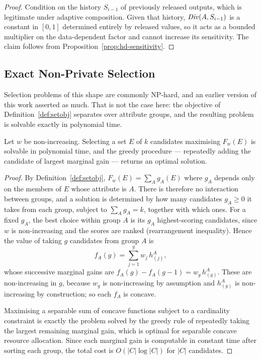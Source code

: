 \begin{proof}
Condition on the history $S_{i-1}$ of previously released outputs, which is legitimate under adaptive composition.
Given that history, $\mathit{Div}(A,S_{i-1})$ is a constant in $[0,1]$ determined entirely by released values, so it acts as a bounded multiplier on the data-dependent factor and cannot increase its sensitivity.
The claim follows from Proposition~\ref{prop:hd-sensitivity}.
\end{proof}

\subsection{Exact Non-Private Selection}
\label{subsec:non-private-hardness}

Selection problems of this shape are commonly NP-hard, and an earlier version of this work asserted as much.
That is not the case here: the objective of Definition~\ref{def:setobj} separates over attribute groups, and the resulting problem is solvable exactly in polynomial time.

\begin{theorem}
\label{thm:non-private-hardness}
Let $w$ be non-increasing.
Selecting a set $E$ of $k$ candidates maximising $F_w(E)$ is solvable in polynomial time, and the greedy procedure --- repeatedly adding the candidate of largest marginal gain --- returns an optimal solution.
\end{theorem}

\begin{proof}
By Definition~\ref{def:setobj}, $F_w(E)=\sum_A g_A(E)$ where $g_A$ depends only on the members of $E$ whose attribute is $A$.
There is therefore no interaction between groups, and a solution is determined by how many candidates $g_A\ge0$ it takes from each group, subject to $\sum_A g_A=k$, together with which ones.
For a fixed $g_A$, the best choice within group $A$ is its $g_A$ highest-scoring candidates, since $w$ is non-increasing and the scores are ranked (rearrangement inequality).
Hence the value of taking $g$ candidates from group $A$ is
\[
f_A(g)=\sum_{j=1}^{g} w_j\, h^A_{(j)},
\]
whose successive marginal gains are $f_A(g)-f_A(g-1)=w_g\,h^A_{(g)}$.
These are non-increasing in $g$, because $w_g$ is non-increasing by assumption and $h^A_{(g)}$ is non-increasing by construction; so each $f_A$ is concave.

Maximising a separable sum of concave functions subject to a cardinality constraint is exactly the problem solved by the greedy rule of repeatedly taking the largest remaining marginal gain, which is optimal for separable concave resource allocation.
Since each marginal gain is computable in constant time after sorting each group, the total cost is $O(|C|\log|C|)$ for $|C|$ candidates.
\end{proof}

